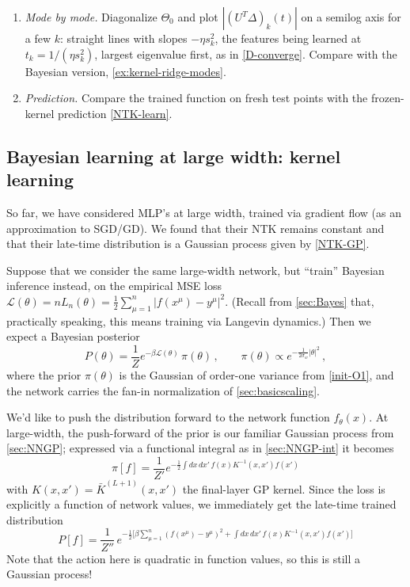 \documentclass[11pt]{article}
\newcommand{\CL}{{\mathcal L}}
\begin{document}
\begin{exercise}
\begin{enumerate}
    \item \emph{Mode by mode.} Diagonalize $\Theta_0$ and plot $|(U^T\Delta)_k(t)|$ on a semilog axis for a few $k$: straight lines with slopes $-\eta s_k^2$, the features being learned at $t_k = 1/(\eta s_k^2)$, largest eigenvalue first, as in \eqref{D-converge}. Compare with the Bayesian version, \cref{ex:kernel-ridge-modes}.
    \item \emph{Prediction.} Compare the trained function on fresh test points with the frozen-kernel prediction \eqref{NTK-learn}.
\end{enumerate}
\end{exercise}




\subsection{Bayesian learning at large width: kernel learning}
\label{sec:Bayes-kernel}

So far, we have considered MLP's at large width, trained via gradient flow (as an approximation to SGD/GD). We found that their NTK remains constant and that their late-time distribution is a Gaussian process given by \eqref{NTK-GP}.

Suppose that we consider the same large-width network, but ``train'' Bayesian inference instead, on the empirical MSE loss $\CL(\theta) = n L_n(\theta) = \frac{1}{2}\sum_{\mu=1}^n |f(x^\mu)-y^\mu|^2 $. (Recall from \cref{sec:Bayes} that, practically speaking, this means training via Langevin dynamics.) Then we expect a Bayesian posterior
%
\begin{equation}
    P(\theta) = \frac{1}{Z}e^{-\beta \CL(\theta)}\, \pi(\theta)\,,\qquad \pi(\theta) \propto e^{\textstyle-\frac{1}{2\sigma_w}|\theta|^2}\,,
\end{equation}
%
where the prior $\pi(\theta)$ is the Gaussian of order-one variance from \eqref{init-O1}, and the network carries the fan-in normalization of \cref{sec:basicscaling}.

We'd like to push the distribution forward to the network function $f_\theta(x)$. At large-width, the push-forward of the prior is our familiar Gaussian process from \cref{sec:NNGP}; expressed via a functional integral as in \cref{sec:NNGP-int} it becomes
%
\begin{equation} \pi[f] = \frac{1}{Z'} e^{\textstyle -\frac{1}{2}\int dx\,dx'\, f(x)  K^{-1}(x,x')f(x')}
\end{equation}
%
with $K(x,x')=\bar K^{(L+1)}(x,x')$ the final-layer GP kernel.
Since the loss is explicitly a function of network values, we immediately get the late-time trained distribution
%
\begin{equation}
    P[f] = \frac{1}{Z''}\,e^{\textstyle -\frac{1}{2}\Big[\beta \sum_{\mu=1}^n(f(x^\mu)-y^\mu)^2 + \int dx\,dx'\, f(x)  K^{-1}(x,x')f(x') \Big] } 
\end{equation}
%
Note that the action here is quadratic in function values, so this is still a Gaussian process!
\end{document}
